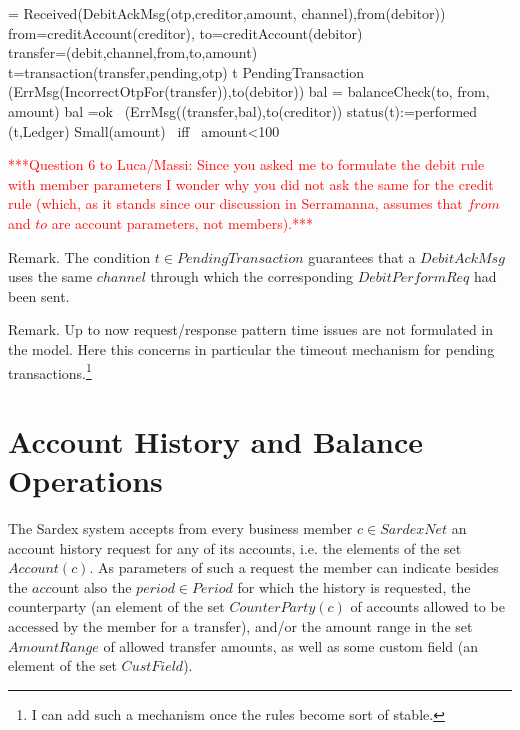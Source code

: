  \begin{asm}  
  =\+           
\IF Received(DebitAckMsg(otp,creditor,amount, channel),from(debitor)) \THEN \+ 
  \LET from=creditAccount(creditor), to=creditAccount(debitor)\\
  \LET transfer=(debit,channel,from,to,amount) \\   
  \LET t=transaction(transfer,pending,otp) \+
    \IF t \not \in PendingTransaction \THEN \+
      (ErrMsg(IncorrectOtpFor(transfer)),to(debitor)) \ELSE \+
        \LET bal = balanceCheck(to, from, amount) \+
          \IF bal \not =ok \THEN ~(ErrMsg((transfer,bal),to(creditor)) \ELSE \+
            status(t):=performed \\
            (t,Ledger) \dec\dec\dec\dec\dec\dec\-       
\WHERE \+
Small(amount) \mbox{ iff } amount<100
\end{asm}



\vspace{12pt}
\textcolor{red}{***Question 6 to Luca/Massi:  Since you asked me to formulate the debit rule with member parameters I wonder why you did not ask the same for the credit rule (which, as it stands since our discussion in Serramanna, assumes that $from$ and $to$ are account parameters, not members).***}
\vspace{12pt}


Remark. The condition $t \in PendingTransaction$ guarantees that a $DebitAckMsg$ uses the same $channel$ through which the corresponding $DebitPerformReq$ had been sent.

Remark. Up to now request/response pattern time issues are not formulated in the model. Here this concerns in particular the  timeout mechanism for pending transactions.\footnote{I can add such a mechanism once the rules become sort of stable.}

\section{Account History and Balance Operations}
\label{sect:accHistory}

The Sardex system accepts from every business member $c \in SardexNet$ an account history request for any of its accounts, i.e. the elements of  the set $Account(c)$. As parameters of such a request the member can indicate besides the $acc$ount also 
the $period \in Period$ for which the history is requested, the counterparty (an 
element of the set $CounterParty(c)$  of accounts allowed to be accessed by the 
member for a transfer), and/or the amount range in the set $AmountRange$ of allowed 
transfer amounts, as well as some custom field (an element of the set $CustField$).



